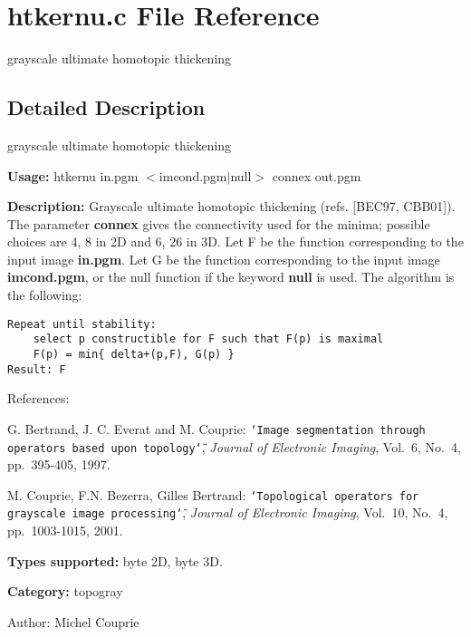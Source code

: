 \section{htkernu.c File Reference}
\label{htkernu_8c}
grayscale ultimate homotopic thickening  




\label{_details}
\subsection{Detailed Description}
grayscale ultimate homotopic thickening 

{\bf Usage:} htkernu in.pgm $<$imcond.pgm$|$null$>$ connex out.pgm

{\bf Description:} Grayscale ultimate homotopic thickening (refs. [BEC97, CBB01]). The parameter {\bf connex} gives the connectivity used for the minima; possible choices are 4, 8 in 2D and 6, 26 in 3D. Let F be the function corresponding to the input image {\bf in.pgm}. Let G be the function corresponding to the input image {\bf imcond.pgm}, or the null function if the keyword {\bf null} is used. The algorithm is the following:



\begin{footnotesize}\begin{verbatim}
Repeat until stability:
    select p constructible for F such that F(p) is maximal
    F(p) = min{ delta+(p,F), G(p) }    
Result: F
\end{verbatim}
\end{footnotesize}


References:\par
 [BEC97] G. Bertrand, J. C. Everat and M. Couprie: {\tt \char`\"{}Image segmentation through operators based upon topology\char`\"{}}, {\em  Journal of Electronic Imaging\/}, Vol.~6, No.~4, pp.~395-405, 1997.\par
 [CBB01] M. Couprie, F.N. Bezerra, Gilles Bertrand: {\tt \char`\"{}Topological operators for grayscale image processing\char`\"{}}, {\em  Journal of Electronic Imaging\/}, Vol.~10, No.~4, pp.~1003-1015, 2001.

{\bf Types supported:} byte 2D, byte 3D.

{\bf Category:} topogray

\begin{Desc}
\item[Author:]Michel Couprie \end{Desc}
